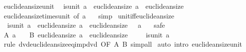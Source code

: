 \begin{isabellebody}
\isanewline
{}\isamarkupfalse%
%
\endisatagproof
{\isafoldproof}%
%
\isadelimproof
\isanewline
%
\endisadelimproof
\isanewline
{}\isamarkupfalse%
\ euclidean{\isacharunderscore}{\kern0pt}size{\isacharunderscore}{\kern0pt}unit{\isacharcolon}{\kern0pt}\isanewline
\ \ {\isachardoublequoteopen}is{\isacharunderscore}{\kern0pt}unit\ a\ {\isasymLongrightarrow}\ euclidean{\isacharunderscore}{\kern0pt}size\ a\ {\isacharequal}{\kern0pt}\ euclidean{\isacharunderscore}{\kern0pt}size\ {}{\isachardoublequoteclose}\isanewline
%
\isadelimproof
\ \ %
\endisadelimproof
%
\isatagproof
{}\isamarkupfalse%
\ euclidean{\isacharunderscore}{\kern0pt}size{\isacharunderscore}{\kern0pt}times{\isacharunderscore}{\kern0pt}unit\ {\isacharbrackleft}{\kern0pt}of\ a\ {}{\isacharbrackright}{\kern0pt}\ \isamarkupfalse%
\ simp%
\endisatagproof
{\isafoldproof}%
%
\isadelimproof
\isanewline
%
\endisadelimproof
\isanewline
{}\isamarkupfalse%
\ unit{\isacharunderscore}{\kern0pt}iff{\isacharunderscore}{\kern0pt}euclidean{\isacharunderscore}{\kern0pt}size{\isacharcolon}{\kern0pt}\ \isanewline
\ \ {\isachardoublequoteopen}is{\isacharunderscore}{\kern0pt}unit\ a\ {\isasymlongleftrightarrow}\ euclidean{\isacharunderscore}{\kern0pt}size\ a\ {\isacharequal}{\kern0pt}\ euclidean{\isacharunderscore}{\kern0pt}size\ {}\ {\isasymand}\ a\ {\isasymnoteq}\ {}{\isachardoublequoteclose}\isanewline
%
\isadelimproof
%
\endisadelimproof
%
\isatagproof
{}\isamarkupfalse%
\ safe\isanewline
\ \ \isamarkupfalse%
\ A{\isacharcolon}{\kern0pt}\ {\isachardoublequoteopen}a\ {\isasymnoteq}\ {}{\isachardoublequoteclose}\ \ B{\isacharcolon}{\kern0pt}\ {\isachardoublequoteopen}euclidean{\isacharunderscore}{\kern0pt}size\ a\ {\isacharequal}{\kern0pt}\ euclidean{\isacharunderscore}{\kern0pt}size\ {}{\isachardoublequoteclose}\isanewline
\ \ \isamarkupfalse%
\ {\isachardoublequoteopen}is{\isacharunderscore}{\kern0pt}unit\ a{\isachardoublequoteclose}\isanewline
\ \ \ \ \isamarkupfalse%
\ {\isacharparenleft}{\kern0pt}rule\ dvd{\isacharunderscore}{\kern0pt}euclidean{\isacharunderscore}{\kern0pt}size{\isacharunderscore}{\kern0pt}eq{\isacharunderscore}{\kern0pt}imp{\isacharunderscore}{\kern0pt}dvd\ {\isacharbrackleft}{\kern0pt}OF\ A\ B{\isacharbrackright}{\kern0pt}{\isacharparenright}{\kern0pt}\ simp{\isacharunderscore}{\kern0pt}all\isanewline
{}\isamarkupfalse%
\ {\isacharparenleft}{\kern0pt}auto\ intro{\isacharcolon}{\kern0pt}\ euclidean{\isacharunderscore}{\kern0pt}size{\isacharunderscore}{\kern0pt}unit{\isacharparenright}{\kern0pt}%

\end{isabellebody}
